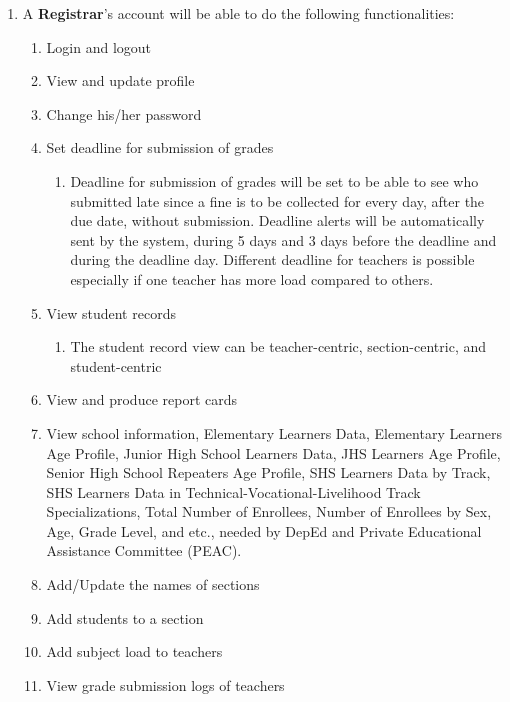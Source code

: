 \documentclass[11pt,a4paper,titlepage]{article}
\begin{document}
\begin{enumerate}
    \item A \textbf{Registrar}'s account will be able to do the following functionalities:
    \begin{enumerate}
        \item Login and logout
        \item View and update profile
        \item Change his/her password
        \item Set deadline for submission of grades
        \begin{enumerate}
            \item Deadline for submission of grades will be set to be able to see who submitted late since a fine is to be collected for every day, after the due date, without submission. Deadline alerts will be automatically sent by the system, during 5 days and 3 days before the deadline and during the deadline day. Different deadline for teachers is possible especially if one teacher has more load compared to others.
        \end{enumerate}
        \item View student records
        \begin{enumerate}
            \item The student record view can be teacher-centric, section-centric, and student-centric
        \end{enumerate}
        \item View and produce report cards
        \item View school information, Elementary Learners Data, Elementary Learners Age Profile, Junior High School Learners Data, JHS Learners Age Profile, Senior High School Repeaters Age Profile, SHS Learners Data by Track, SHS Learners Data in Technical-Vocational-Livelihood Track Specializations, Total Number of Enrollees, Number of Enrollees by Sex, Age, Grade Level, and etc., needed by DepEd and Private Educational Assistance Committee (PEAC).
        \item Add/Update the names of sections
        \item Add students to a section
        \item Add subject load to teachers
        \item View grade submission logs of teachers
    \end{enumerate}


\end{enumerate}
\end{document}

